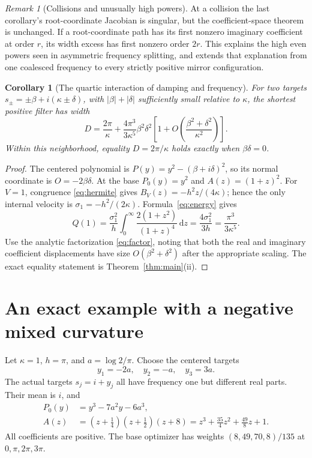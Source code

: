 \documentclass[11pt]{article}
\newtheorem{corollary}[theorem]{Corollary}
\theoremstyle{remark}\newtheorem{remark}[theorem]{Remark}
\newcommand{\dd}{\,\mathrm d}\newcommand{\supp}{\operatorname{supp}}
\newcommand{\abs}[1]{\left\lvert#1\right\rvert}
\begin{document}
\begin{remark}[Collisions and unusually high powers]
At a collision the last corollary's root-coordinate Jacobian is singular,
but the coefficient-space theorem is unchanged. If a root-coordinate path
has its first nonzero imaginary coefficient at order $r$, its width
excess has first nonzero order $2r$. This explains the high even powers
seen in asymmetric frequency splitting, and extends that explanation from
one coalesced frequency to every strictly positive mirror configuration.
\end{remark}

\begin{corollary}[The quartic interaction of damping and frequency]
\label{cor:quartic}
For two targets
$s_\pm=\pm\beta+i(\kappa\pm\delta)$, with
$\abs\beta+\abs\delta$ sufficiently small relative to $\kappa$, the
shortest positive filter has width
\[
 D=\frac{2\pi}{\kappa}
 +\frac{4\pi^3}{3\kappa^5}\beta^2\delta^2
 \left[1+O\left(\frac{\beta^2+\delta^2}{\kappa^2}\right)\right].
\]
Within this neighborhood, equality $D=2\pi/\kappa$ holds exactly when
$\beta\delta=0$.
\end{corollary}

\begin{proof}
The centered polynomial is
$P(y)=y^2-(\beta+i\delta)^2$, so its normal coordinate is
$O=-2\beta\delta$. At the base $P_0(y)=y^2$ and $A(z)=(1+z)^2$.
For $V=1$, congruence \eqref{eq:hermite} gives
$B_V(z)=-h^2z/(4\kappa)$; hence the only internal velocity is
$\sigma_1=-h^2/(2\kappa)$. Formula~\eqref{eq:energy} gives
\[
 Q(1)=\frac{\sigma_1^2}{h}
       \int_0^\infty\frac{2(1+z^2)}{(1+z)^4}\dd z
      =\frac{4\sigma_1^2}{3h}=\frac{\pi^3}{3\kappa^5}.
\]
Use the analytic factorization \eqref{eq:factor}, noting that both the
real and imaginary coefficient displacements have size
$O(\beta^2+\delta^2)$ after the appropriate scaling. The exact equality
statement is Theorem~\ref{thm:main}(ii).
\end{proof}

\section{An exact example with a negative mixed curvature}

Let $\kappa=1$, $h=\pi$, and $a=\log 2/\pi$. Choose the centered targets
\[
 y_1=-2a,\quad y_2=-a,\quad y_3=3a.
\]
The actual targets $s_j=i+y_j$ all have frequency one but different
real parts. Their mean is $i$, and
\begin{align*}
 P_0(y)&=y^3-7a^2y-6a^3,\\
 A(z)&=(z+\tfrac14)(z+\tfrac12)(z+8)
      =z^3+\tfrac{35}{4}z^2+\tfrac{49}{8}z+1.
\end{align*}
All coefficients are positive. The base optimizer has weights
$(8,49,70,8)/135$ at $0,\pi,2\pi,3\pi$.
\end{document}
